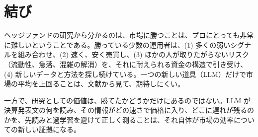 \section{結び}

ヘッジファンドの研究から分かるのは、市場に勝つことは、プロにとっても非常に難しいということである。勝っている少数の運用者は、(1) 多くの弱いシグナルを組み合わせ、(2) 速く、安く売買し、(3) ほかの人が取りたがらないリスク（流動性、急落、混雑の解消）を、それに耐えられる資金の構造で引き受け、(4) 新しいデータと方法を探し続けている。一つの新しい道具（LLM）だけで市場の平均を上回ることは、文献から見て、期待しにくい。

一方で、研究としての価値は、勝てたかどうかだけにあるのではない。LLM が決算発表文の何を読み、その情報がどの速さで価格に入り、どこに遅れが残るのかを、先読みと過学習を避けて正しく測ることは、それ自体が市場の効率についての新しい証拠になる。
